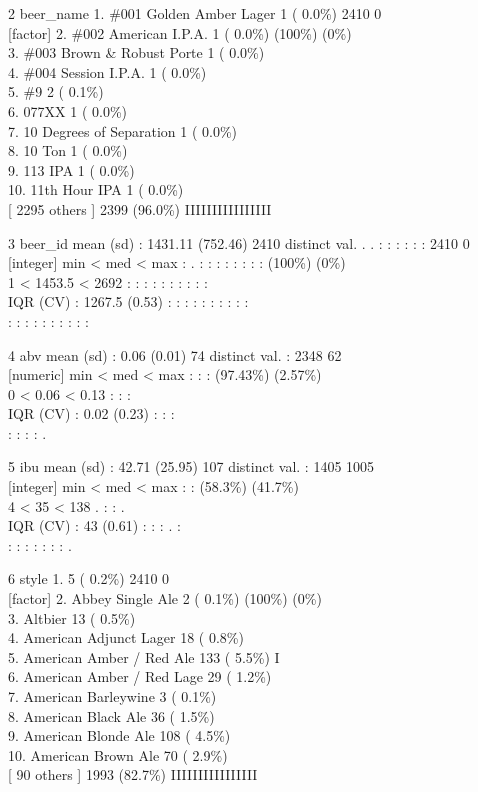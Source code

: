 \documentclass[]{article}
\begin{document}
2 beer\_name 1. \#001 Golden Amber Lager 1 ( 0.0\%) 2410 0\\
{[}factor{]} 2. \#002 American I.P.A. 1 ( 0.0\%) (100\%) (0\%)\\
3. \#003 Brown \& Robust Porte 1 ( 0.0\%)\\
4. \#004 Session I.P.A. 1 ( 0.0\%)\\
5. \#9 2 ( 0.1\%)\\
6. 077XX 1 ( 0.0\%)\\
7. 10 Degrees of Separation 1 ( 0.0\%)\\
8. 10 Ton 1 ( 0.0\%)\\
9. 113 IPA 1 ( 0.0\%)\\
10. 11th Hour IPA 1 ( 0.0\%)\\
{[} 2295 others {]} 2399 (96.0\%) IIIIIIIIIIIIIIII

3 beer\_id mean (sd) : 1431.11 (752.46) 2410 distinct val. . . : : : : :
: 2410 0\\
{[}integer{]} min \textless{} med \textless{} max : . : : : : : : : :
(100\%) (0\%)\\
1 \textless{} 1453.5 \textless{} 2692 : : : : : : : : : :\\
IQR (CV) : 1267.5 (0.53) : : : : : : : : : :\\
: : : : : : : : : :

4 abv mean (sd) : 0.06 (0.01) 74 distinct val. : 2348 62\\
{[}numeric{]} min \textless{} med \textless{} max : : : (97.43\%)
(2.57\%)\\
0 \textless{} 0.06 \textless{} 0.13 : : :\\
IQR (CV) : 0.02 (0.23) : : :\\
: : : : .

5 ibu mean (sd) : 42.71 (25.95) 107 distinct val. : 1405 1005\\
{[}integer{]} min \textless{} med \textless{} max : : (58.3\%)
(41.7\%)\\
4 \textless{} 35 \textless{} 138 . : : .\\
IQR (CV) : 43 (0.61) : : : . :\\
: : : : : : : .

6 style 1. 5 ( 0.2\%) 2410 0\\
{[}factor{]} 2. Abbey Single Ale 2 ( 0.1\%) (100\%) (0\%)\\
3. Altbier 13 ( 0.5\%)\\
4. American Adjunct Lager 18 ( 0.8\%)\\
5. American Amber / Red Ale 133 ( 5.5\%) I\\
6. American Amber / Red Lage 29 ( 1.2\%)\\
7. American Barleywine 3 ( 0.1\%)\\
8. American Black Ale 36 ( 1.5\%)\\
9. American Blonde Ale 108 ( 4.5\%)\\
10. American Brown Ale 70 ( 2.9\%)\\
{[} 90 others {]} 1993 (82.7\%) IIIIIIIIIIIIIIII
\end{document}
